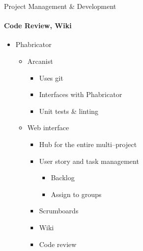 \begin{frame}{Project Management \& Development}\framesubtitle{Code Review, Wiki}
    \begin{itemize}
        \item Phabricator
        \begin{itemize}
            \item Arcanist
            \begin{itemize}
                \item Uses git
                \item Interfaces with Phabricator
                \item Unit tests \& linting
            \end{itemize}
            \item Web interface
            \begin{itemize}
                \item Hub for the entire multi--project
                \item User story and task management
                \begin{itemize}
                    \item Backlog
                    \item Assign to groups
                \end{itemize}
                \item Scrumboards
                \item Wiki
                \item Code review
            \end{itemize}
        \end{itemize}
    \end{itemize}
\end{frame}
